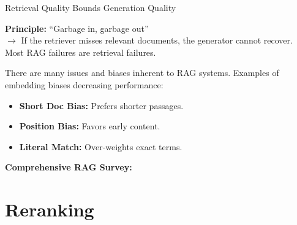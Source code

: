 \documentclass[11pt,compress,t,notes=noshow, xcolor=table]{beamer}
\begin{document}
\begin{frame}{Retrieval Quality Bounds Generation Quality}

\vfill

\textbf{Principle:} ``Garbage in, garbage out'' \\
$\rightarrow$ If the retriever misses relevant documents, the generator cannot recover. Most RAG failures are retrieval failures.

\vspace{2em}

There are many issues and biases inherent to RAG systems. Examples of embedding biases decreasing performance: 

\begin{itemize}
    \item \textbf{Short Doc Bias:} Prefers shorter passages.
    \item \textbf{Position Bias:} Favors early content.
    \item \textbf{Literal Match:} Over-weights exact terms.
\end{itemize}

\vspace{2em}

\textbf{Comprehensive RAG Survey:} 

\vfill

\end{frame}


\section{Reranking}
\end{document}
